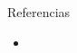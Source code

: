 \begin{frame}{Referencias}
  \footnotesize
  \begin{itemize}
    \item {}
  \end{itemize}
\end{frame}
